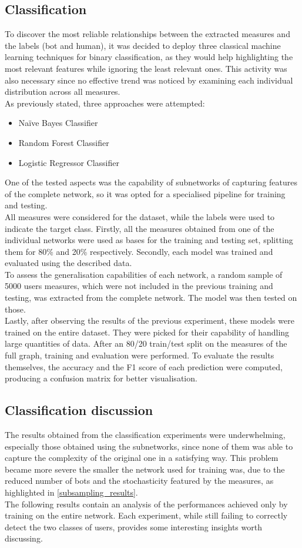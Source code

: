 \documentclass[12pt, a4paper]{article}
\begin{document}
    \subsection{Classification}
    	To discover the most reliable relationships between the extracted measures and the labels (bot and human), it was decided to deploy three classical machine learning techniques for binary classification, as they would help highlighting the most relevant features while ignoring the least relevant ones. This activity was also necessary since no effective trend was noticed by examining each individual distribution across all measures.\\
    	As previously stated, three approaches were attempted:
    	\begin{itemize}
        	\item Na\"ive Bayes Classifier
        	\item Random Forest Classifier
        	\item Logistic Regressor Classifier
    	\end{itemize}
    	One of the tested aspects was the capability of subnetworks of capturing features of the complete network, so it was opted for a specialised pipeline for training and testing.\\
    	All measures were considered for the dataset, while the labels were used to indicate the target class. Firstly, all the measures obtained from one of the individual networks were used as bases for the training and testing set, splitting them for 80\% and 20\% respectively. Secondly, each model was trained and evaluated using the described data.\\
    	To assess the generalisation capabilities of each network, a random sample of 5000 users measures, which were not included in the previous training and testing, was extracted from the complete network. The model was then tested on those.\\
    	Lastly, after observing the results of the previous experiment, these models were trained on the entire dataset. They were picked for their capability of handling large quantities of data. After an 80/20 train/test split on the measures of the full graph, training and evaluation were performed.
    	To evaluate the results themselves, the accuracy and the F1 score of each prediction were computed, producing a confusion matrix for better visualisation.
    \subsection{Classification discussion}
    	The results obtained from the classification experiments were underwhelming, especially those obtained using the subnetworks, since none of them was able to capture the complexity of the original one in a satisfying way. This problem became more severe the smaller the network used for training was, due to the reduced number of bots and the stochasticity featured by the measures, as highlighted in \ref{subsampling_results}.\\
    	The following results contain an analysis of the performances achieved only by training on the entire network. Each experiment, while still failing to correctly detect the two classes of users, provides some interesting insights worth discussing.
\end{document}
